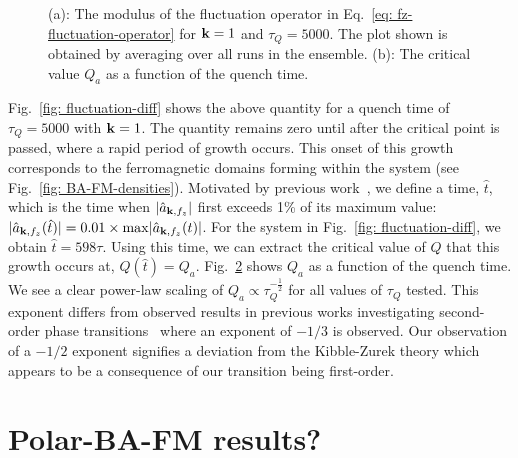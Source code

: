 \begin{figure}[tb]
\begin{subfigure}{0.45\textwidth}
        \caption{}
        \label{fig: Q_a-scaling}
    \end{subfigure}
    \caption{(a): The modulus of the fluctuation operator in
    Eq.~\eqref{eq: fz-fluctuation-operator} for $\vb{k}=1$ and $\tau_Q=5000$.
    The plot shown is obtained by averaging over all runs in the ensemble.
    (b): The critical value $Q_a$ as a function of the quench time.
    }
\end{figure}
Fig.~\ref{fig: fluctuation-diff} shows the above quantity for a quench time
of $\tau_Q=5000$ with $\vb{k}=1$.
The quantity remains zero until after the critical point is passed, where
a rapid period of growth occurs.
This onset of this growth corresponds to the ferromagnetic domains forming
within the system (see Fig.~\ref{fig: BA-FM-densities}).
Motivated by previous work~\cite{Damski2007, Qiu2020}, we define a time,
$\hat{t}$, which is the time when $|\hat{a}_{\vb{k}, {f_z}}|$ first exceeds
1\% of its maximum value: $|\hat{a}_{\vb{k}, {f_z}}(\hat{t})| =
0.01\times \mathrm{max}|\hat{a}_{\vb{k}, {f_z}}(t)|$.
For the system in Fig.~\ref{fig: fluctuation-diff}, we obtain $\hat{t}=598\tau$.
Using this time, we can extract the critical value of $Q$ that this growth
occurs at, $Q(\hat{t}) = Q_a$.
Fig.~\ref{fig: Q_a-scaling} shows $Q_a$ as a function of the quench time.
We see a clear power-law scaling of $Q_a \propto \tau_Q^{-\frac{1}{2}}$ for
all values of $\tau_Q$ tested.
This exponent differs from observed results in previous works investigating
second-order phase transitions~\cite{Damski2007, Anquez2016, Swislocki2013}
where an exponent of $-1/3$ is observed.
Our observation of a $-1/2$ exponent signifies a deviation from
the Kibble-Zurek theory which appears to be a consequence of our transition
being first-order.

\section{Polar-BA-FM results?}
